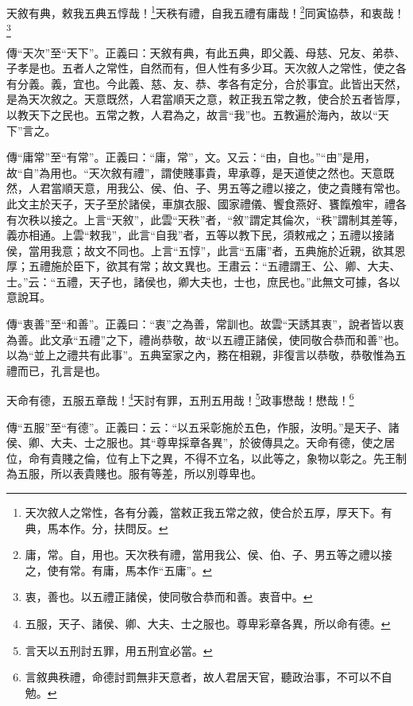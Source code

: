 天敘有典，敕我五典五惇哉！\footnote{天次敘人之常性，各有分義，當敕正我五常之敘，使合於五厚，厚天下。有典，馬本作。分，扶問反。}天秩有禮，自我五禮有庸哉！\footnote{庸，常。自，用也。天次秩有禮，當用我公、侯、伯、子、男五等之禮以接之，使有常。有庸，馬本作“五庸”。}同寅協恭，和衷哉！\footnote{衷，善也。以五禮正諸侯，使同敬合恭而和善。衷音中。}


{\noindent\zhuan{}\fzbyks 傳“天次”至“天下”。正義曰：天敘有典，有此五典，即父義、母慈、兄友、弟恭、子孝是也。五者人之常性，自然而有，但人性有多少耳。天次敘人之常性，使之各有分義。義，宜也。今此義、慈、友、恭、孝各有定分，合於事宜。此皆出天然，是為天次敘之。天意既然，人君當順天之意，敕正我五常之教，使合於五者皆厚，以教天下之民也。五常之教，人君為之，故言“我”也。五教遍於海內，故以“天下”言之。 \par}

{\noindent\zhuan{}\fzbyks 傳“庸常”至“有常”。正義曰：“庸，常”，文。又云：“由，自也。”“由”是用，故“自”為用也。“天次敘有禮”，謂使賤事貴，卑承尊，是天道使之然也。天意既然，人君當順天意，用我公、侯、伯、子、男五等之禮以接之，使之貴賤有常也。此文主於天子，天子至於諸侯，車旗衣服、國家禮儀、饗食燕好、饔餼飧牢，禮各有次秩以接之。上言“天敘”，此雲“天秩”者，“敘”謂定其倫次，“秩”謂制其差等，義亦相通。上雲“敕我”，此言“自我”者，五等以教下民，須敕戒之；五禮以接諸侯，當用我意；故文不同也。上言“五惇”，此言“五庸”者，五典施於近親，欲其恩厚；五禮施於臣下，欲其有常；故文異也。王肅云：“五禮謂王、公、卿、大夫、士。”云：“五禮，天子也，諸侯也，卿大夫也，士也，庶民也。”此無文可據，各以意說耳。 \par}

{\noindent\zhuan{}\fzbyks 傳“衷善”至“和善”。正義曰：“衷”之為善，常訓也。故雲“天誘其衷”，說者皆以衷為善。此文承“五禮”之下，禮尚恭敬，故“以五禮正諸侯，使同敬合恭而和善”也。以為“並上之禮共有此事”。五典室家之內，務在相親，非復言以恭敬，恭敬惟為五禮而已，孔言是也。 \par}

天命有德，五服五章哉！\footnote{五服，天子、諸侯、卿、大夫、士之服也。尊卑彩章各異，所以命有德。}天討有罪，五刑五用哉！\footnote{言天以五刑討五罪，用五刑宜必當。}政事懋哉！懋哉！\footnote{言敘典秩禮，命德討罰無非天意者，故人君居天官，聽政治事，不可以不自勉。}

{\noindent\zhuan{}\fzbyks 傳“五服”至“有德”。正義曰：云：“以五采彰施於五色，作服，汝明。”是天子、諸侯、卿、大夫、士之服也。其“尊卑採章各異”，於彼傳具之。天命有德，使之居位，命有貴賤之倫，位有上下之異，不得不立名，以此等之，象物以彰之。先王制為五服，所以表貴賤也。服有等差，所以別尊卑也。 \par}

